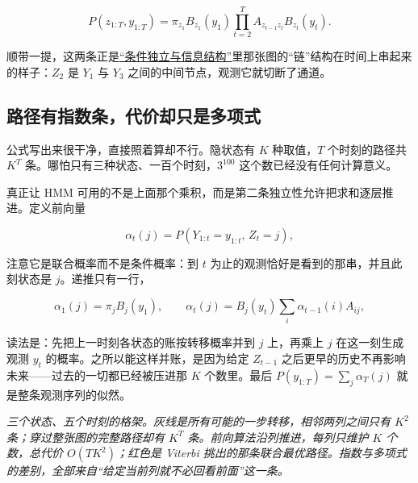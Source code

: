 \[
P(z_{1:T},y_{1:T})=\pi_{z_1}B_{z_1}(y_1)\prod_{t=2}^{T}A_{z_{t-1}z_t}B_{z_t}(y_t).
\]

顺带一提，这两条正是\hyperref[sec:05-Probability/02-Conditional-Probability/04]{``条件独立与信息结构''}里那张图的``链''结构在时间上串起来的样子：\(Z_2\) 是 \(Y_1\) 与 \(Y_3\) 之间的中间节点，观测它就切断了通道。

\subsection{路径有指数条，代价却只是多项式}

公式写出来很干净，直接照着算却不行。隐状态有 \(K\) 种取值，\(T\) 个时刻的路径共 \(K^{T}\) 条。哪怕只有三种状态、一百个时刻，\(3^{100}\) 这个数已经没有任何计算意义。

真正让 HMM 可用的不是上面那个乘积，而是第二条独立性允许把求和逐层推进。定义前向量

\[
\alpha_t(j)=P(Y_{1:t}=y_{1:t},\,Z_t=j),
\]

注意它是联合概率而不是条件概率：到 \(t\) 为止的观测恰好是看到的那串，并且此刻状态是 \(j\)。递推只有一行，

\[
\alpha_1(j)=\pi_jB_j(y_1),\qquad
\alpha_t(j)=B_j(y_t)\sum_i\alpha_{t-1}(i)A_{ij},
\]

读法是：先把上一时刻各状态的账按转移概率并到 \(j\) 上，再乘上 \(j\) 在这一刻生成观测 \(y_t\) 的概率。之所以能这样并账，是因为给定 \(Z_{t-1}\) 之后更早的历史不再影响未来——过去的一切都已经被压进那 \(K\) 个数里。最后 \(P(y_{1:T})=\sum_j\alpha_T(j)\) 就是整条观测序列的似然。

\begin{center}

\emph{三个状态、五个时刻的格架。灰线是所有可能的一步转移，相邻两列之间只有 \(K^2\) 条；穿过整张图的完整路径却有 \(K^{T}\) 条。前向算法沿列推进，每列只维护 \(K\) 个数，总代价 \(O(TK^2)\)；红色是 Viterbi 挑出的那条联合最优路径。指数与多项式的差别，全部来自``给定当前列就不必回看前面''这一条。}
\end{center}

